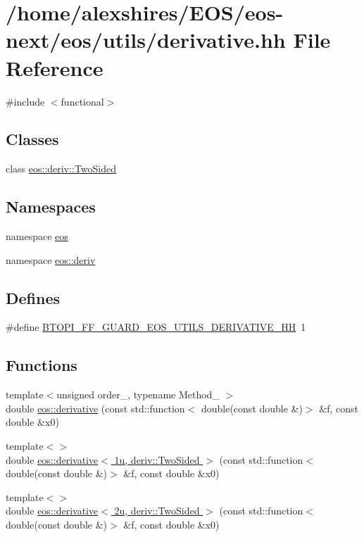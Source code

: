 \hypertarget{derivative_8hh}{
\section{/home/alexshires/EOS/eos-\/next/eos/utils/derivative.hh File Reference}
\label{derivative_8hh}
}
{\ttfamily \#include $<$functional$>$}\par
\subsection*{Classes}
\begin{DoxyCompactItemize}
\item 
class \hyperlink{classeos_1_1deriv_1_1TwoSided}{eos::deriv::TwoSided}
\end{DoxyCompactItemize}
\subsection*{Namespaces}
\begin{DoxyCompactItemize}
\item 
namespace \hyperlink{namespaceeos}{eos}
\item 
namespace \hyperlink{namespaceeos_1_1deriv}{eos::deriv}
\end{DoxyCompactItemize}
\subsection*{Defines}
\begin{DoxyCompactItemize}
\item 
\#define \hyperlink{derivative_8hh_a5b68e386effe26d59ccdcc3fbcee7763}{BTOPI\_\-FF\_\-GUARD\_\-EOS\_\-UTILS\_\-DERIVATIVE\_\-HH}~1
\end{DoxyCompactItemize}
\subsection*{Functions}
\begin{DoxyCompactItemize}
\item 
{\footnotesize template$<$unsigned order\_\-, typename Method\_\- $>$ }\\double \hyperlink{namespaceeos_af951dd2b07bb6381c7529bc0558a629a}{eos::derivative} (const std::function$<$ double(const double \&)$>$ \&f, const double \&x0)
\item 
{\footnotesize template$<$$>$ }\\double \hyperlink{namespaceeos_ab2af1ce0d7308e92a859714806a6d4f0}{eos::derivative$<$ 1u, deriv::TwoSided $>$} (const std::function$<$ double(const double \&)$>$ \&f, const double \&x0)
\item 
{\footnotesize template$<$$>$ }\\double \hyperlink{namespaceeos_ab2d67e5e2a1c2f809d76dcfc4ec7f99a}{eos::derivative$<$ 2u, deriv::TwoSided $>$} (const std::function$<$ double(const double \&)$>$ \&f, const double \&x0)
\end{DoxyCompactItemize}


